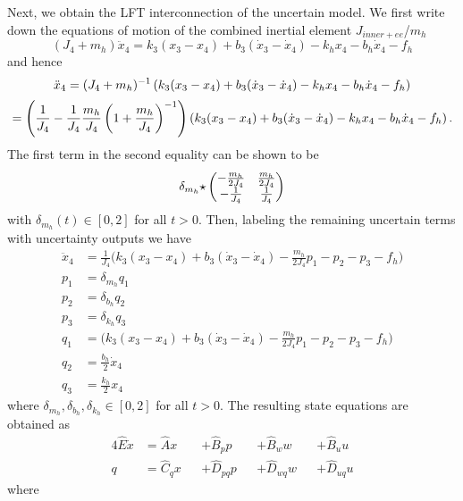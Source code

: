 Next, we obtain the LFT interconnection of the uncertain model. We first write down the equations of motion of the combined inertial element $J_{inner+ee}$/$m_h$
\[
(J_4+m_h)\ddot{x}_4 = k_3(x_3-x_4) + b_3(\dot{x}_3-\dot{x}_4) - k_hx_4 - b_h\dot{x}_4 -f_h
\]
and hence
\[%
\ddot{x}_4 = \inv{(J_4 + m_h)}\left(k_3(x_3-x_4) + b_3(\dot{x}_3-\dot{x}_4) - k_hx_4 - b_h\dot{x}_4 -f_h\right)
\]\[
           = {%
                            \left(\frac{1}{J_4} - \frac{1}{J_4}\frac{m_h}{J_4}\inv{\left(1+\frac{m_h}{J_4}\right)}\right)%
                            }%
        \left(k_3(x_3-x_4) + b_3(\dot{x}_3-\dot{x}_4) - k_hx_4 - b_h\dot{x}_4 -f_h\right).
\]%
The first term in the second equality can be shown to be 
\[
\delta_{m_h}{\displaystyle\star}\begin{pmatrix}-\frac{m_h}{2J_4}&\frac{m_h}{2J_4}\\-\frac{1}{J_4}&\frac{1}{J_4}\end{pmatrix}
\]
with $\delta_{m_h}(t)\in[0,2]$ for all $t>0$. Then, labeling the remaining uncertain terms with uncertainty outputs we have
\begin{align}
\ddot{x}_4 &= \frac{1}{J_4}\bigg(k_3(x_3-x_4) + b_3(\dot{x}_3-\dot{x}_4) - \frac{m_h}{2J_4}p_1 - p_2 - p_3 -f_h\bigg)\\
p_1 &= \delta_{m_h}q_1\\
p_2 &= \delta_{b_h}q_2\\
p_3 &= \delta_{k_h}q_3\\
q_1 &= \bigg(k_3(x_3-x_4) + b_3(\dot{x}_3-\dot{x}_4) - \frac{m_h}{2J_4}p_1 - p_2 - p_3 -f_h\bigg)\\
q_2 &= \frac{b_h}{2}\dot{x}_4\\
q_3 &= \frac{k_h}{2}x_4
\end{align}
where $\delta_{m_h},\delta_{b_h},\delta_{k_h}\in[0,2]$ for all $t>0$. The resulting state equations are obtained as
\begin{alignat}{4}\label{eq:prestateequations1}
\hat{E}\dot{x} &= \hat Ax   &&+ \hat B_p p   &&+ \hat B_w w   &&+ \hat B_u u\\\label{eq:prestateequations2}
q        &= \hat C_qx &&+ \hat D_{pq}p &&+ \hat D_{wq}w &&+ \hat D_{uq}u
\end{alignat}
where 
